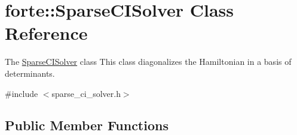\hypertarget{classforte_1_1_sparse_c_i_solver}{}\section{forte\+:\+:Sparse\+C\+I\+Solver Class Reference}
\label{classforte_1_1_sparse_c_i_solver}


The \mbox{\hyperlink{classforte_1_1_sparse_c_i_solver}{Sparse\+C\+I\+Solver}} class This class diagonalizes the Hamiltonian in a basis of determinants.  




{\ttfamily \#include $<$sparse\+\_\+ci\+\_\+solver.\+h$>$}

\subsection*{Public Member Functions}
